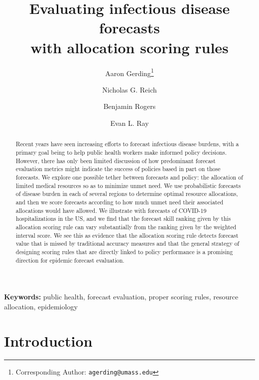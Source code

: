 \documentclass{article}\usepackage[]{graphicx}\usepackage[]{xcolor}
\author{Aaron Gerding\thanks{Corresponding Author: \texttt{agerding@umass.edu}}}
\author{Nicholas G. Reich}
\author{Benjamin Rogers}
\author{Evan L. Ray}
\affil{Department of Biostatistics and Epidemiology, School of Public Health and Health
Sciences, University of Massachusetts at Amherst}
\title{Evaluating infectious disease forecasts \\ with allocation scoring rules}
\begin{document}
\newcommand{\del}[2]{\frac{\partial {#1} }{\partial {#2}} }
\newcommand{\dby}[2]{\frac{d {#1} }{d {#2}} }
\newcommand{\sbar}{\overline{s}}
\newtheorem{proposition}{Proposition}

\theoremstyle{remark}
\newtheorem*{remark}{Remark}

\maketitle







\begin{abstract}
Recent years have seen increasing efforts to forecast infectious disease burdens, with a primary goal being to help
public health workers make informed policy decisions. However, there has only been limited discussion of how
predominant forecast evaluation metrics might indicate the success of policies based in part on those forecasts. We
explore one possible tether between forecasts and policy: the allocation of limited medical resources so as to minimize
unmet need. We use probabilistic forecasts of disease burden in each of several regions to determine optimal resource
allocations, and then we score forecasts according to how much unmet need their associated allocations would have
allowed. We illustrate with forecasts of COVID-19 hospitalizations in the US, and we find that the forecast skill
ranking given by this allocation scoring rule can vary substantially from the ranking given by the weighted interval
score. We see this as evidence that the allocation scoring rule detects forecast value that is missed by traditional
accuracy measures and that the general strategy of designing scoring rules that are directly linked to policy
performance is a promising direction for epidemic forecast evaluation.
\end{abstract}

\noindent \textbf{Keywords:} public health, forecast evaluation, proper scoring rules, resource allocation, epidemiology

\section{Introduction}
\end{document}
